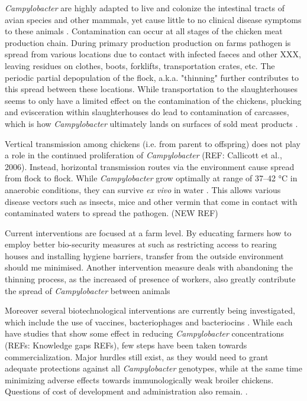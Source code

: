 \textit{Campylobacter} are highly adapted to live and colonize the intestinal tracts of avian species and other mammals, yet cause little to no clinical disease symptoms to these animals \parencite{saif_diseases_2008}. Contamination can occur at all stages of the chicken meat production chain. During primary production production on farms pathogen is spread from various locations due to contact with infected faeces and other XXX, leaving residues on clothes, boots, forklifts, transportation crates, etc. The periodic partial depopulation of the flock, a.k.a. "thinning" further contributes to this spread between these locations. While transportation to the slaughterhouses seems to only have a limited effect on the contamination of the chickens, plucking and  evisceration within slaughterhouses do lead to contamination of carcasses, which is how \textit{Campylobacter} ultimately lands on surfaces of sold meat products \parencite{skarp_campylobacteriosis_2015}.

Vertical transmission among chickens (i.e. from parent to offspring) does not play a role in the continued proliferation of \textit{Campylobacter} (REF: Callicott et al., 2006). Instead, horizontal transmission routes via the environment cause spread from flock to flock. While \textit{Campylobacter} grow optimally at range of 37–42 °C in anaerobic conditions, they can survive \textit{ex vivo} in water \cite{wilson_tracing_2008}. This allows various disease vectors such as insects, mice and other vermin that come in contact with contaminated waters to spread the pathogen. (NEW REF)

Current interventions are focused at a farm level. By educating farmers how to employ better bio-security measures at such as restricting access to rearing houses and installing hygiene barriers, transfer from the outside environment should me minimised. Another intervention measure deals with abandoning the thinning process, as the increased of presence of workers, also greatly contribute the spread of \textit{Campylobacter} between animals \parencite{}

Moreover several biotechnological interventions are currently being investigated, which include the use of vaccines, bacteriophages and bacteriocins \parencite{hansson_knowledge_2018}. While each have studies that show some effect in reducing \textit{Campylobacter} concentrations (REFs: Knowledge gaps REFs), few steps have been taken towards commercialization. Major hurdles still exist, as they would need to grant adequate protections against all \textit{Campylobacter} genotypes, while at the same time minimizing adverse effects towards immunologically weak broiler chickens. Questions of cost of development and administration also remain. \parencite{hansson_knowledge_2018}.

